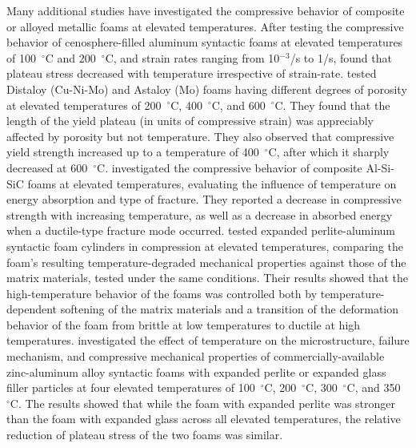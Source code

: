 \documentclass[review]{elsarticle}
\begin{document}
Many additional studies have investigated the compressive behavior of composite or alloyed metallic foams at elevated temperatures. After testing the compressive behavior of cenosphere-filled aluminum syntactic foams at elevated temperatures of 100~$^\circ\mathrm{C}$ and 200~$^\circ\mathrm{C}$, and strain rates ranging from 10$^{-3}$/s to 1/s, \cite{Mondal:2012} found that plateau stress decreased with temperature irrespective of strain-rate. \cite{Bekoz:2014} tested Distaloy (Cu-Ni-Mo) and Astaloy (Mo) foams having different degrees of porosity at elevated temperatures of 200~$^\circ\mathrm{C}$, 400~$^\circ\mathrm{C}$, and 600~$^\circ\mathrm{C}$. They found that the length of the yield plateau (in units of compressive strain) was appreciably affected by porosity but not temperature. They also observed that compressive yield strength increased up to a temperature of 400~$^\circ\mathrm{C}$, after which it sharply decreased at 600~$^\circ\mathrm{C}$. \cite{Liuetal2016} investigated the compressive behavior of composite Al-Si-SiC foams at elevated temperatures, evaluating the influence of temperature on energy absorption and type of fracture. They reported a decrease in compressive strength with increasing temperature, as well as a decrease in absorbed energy when a ductile-type fracture mode occurred. \cite{Taherishargh2018} tested expanded perlite-aluminum syntactic foam cylinders in compression at elevated temperatures, comparing the foam's resulting temperature-degraded mechanical properties against those of the matrix materials, tested under the same conditions. Their results showed that the high-temperature behavior of the foams was controlled both by temperature-dependent softening of the matrix materials and a transition of the deformation behavior of the foam from brittle at low temperatures to ductile at high temperatures. \cite{Linul:2019} investigated the effect of temperature on the microstructure, failure mechanism, and compressive mechanical properties of commercially-available zinc-aluminum alloy syntactic foams with expanded perlite or expanded glass filler particles at four elevated temperatures of 100~$^\circ\mathrm{C}$, 200~$^\circ\mathrm{C}$, 300~$^\circ\mathrm{C}$, and 350~$^\circ\mathrm{C}$. The results showed that while the foam with expanded perlite was stronger than the foam with expanded glass across all elevated temperatures, the relative reduction of plateau stress of the two foams was similar.
\end{document}
